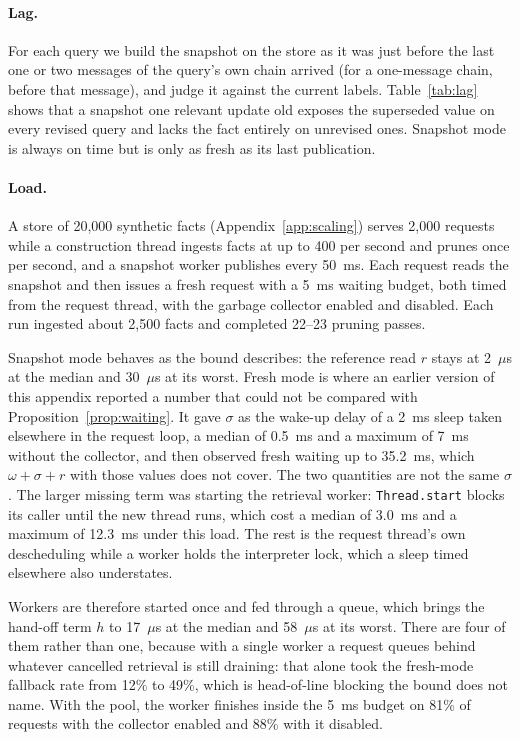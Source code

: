 \documentclass{article} %
\begin{document}
\paragraph{Lag.} For each query we build the snapshot on the store as it was just before the last one or two messages of the query's own chain arrived (for a one-message chain, before that message), and judge it against the current labels. Table~\ref{tab:lag} shows that a snapshot one relevant update old exposes the superseded value on every revised query and lacks the fact entirely on unrevised ones. Snapshot mode is always on time but is only as fresh as its last publication.

\paragraph{Load.} A store of 20{,}000 synthetic facts (Appendix~\ref{app:scaling}) serves 2{,}000 requests while a construction thread ingests facts at up to 400 per second and prunes once per second, and a snapshot worker publishes every 50~ms. Each request reads the snapshot and then issues a fresh request with a 5~ms waiting budget, both timed from the request thread, with the garbage collector enabled and disabled. Each run ingested about 2{,}500 facts and completed 22--23 pruning passes.

Snapshot mode behaves as the bound describes: the reference read $r$ stays at 2~$\mu$s at the median and 30~$\mu$s at its worst. Fresh mode is where an earlier version of this appendix reported a number that could not be compared with Proposition~\ref{prop:waiting}. It gave $\sigma$ as the wake-up delay of a 2~ms sleep taken elsewhere in the request loop, a median of 0.5~ms and a maximum of 7~ms without the collector, and then observed fresh waiting up to 35.2~ms, which $\omega+\sigma+r$ with those values does not cover. The two quantities are not the same $\sigma$. The larger missing term was starting the retrieval worker: \texttt{Thread.start} blocks its caller until the new thread runs, which cost a median of 3.0~ms and a maximum of 12.3~ms under this load. The rest is the request thread's own descheduling while a worker holds the interpreter lock, which a sleep timed elsewhere also understates.

Workers are therefore started once and fed through a queue, which brings the hand-off term $h$ to 17~$\mu$s at the median and 58~$\mu$s at its worst. There are four of them rather than one, because with a single worker a request queues behind whatever cancelled retrieval is still draining: that alone took the fresh-mode fallback rate from 12\% to 49\%, which is head-of-line blocking the bound does not name. With the pool, the worker finishes inside the 5~ms budget on 81\% of requests with the collector enabled and 88\% with it disabled.
\end{document}
